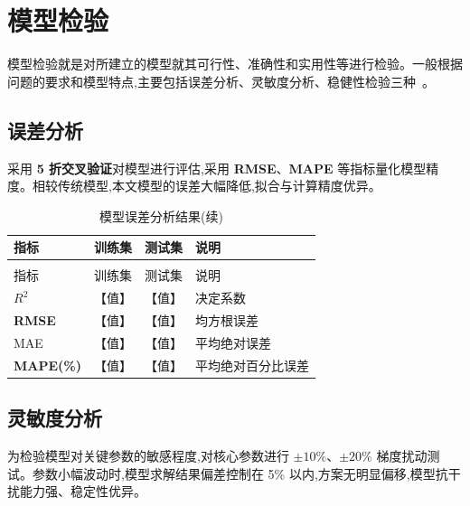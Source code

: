
\section{模型检验}

模型检验就是对所建立的模型就其可行性、准确性和实用性等进行检验。一般根据问题的要求和模型特点,主要包括误差分析、灵敏度分析、稳健性检验三种~\cite{ref3}。

\subsection{误差分析}


采用 \textbf{5 折交叉验证}对模型进行评估,采用 \textbf{RMSE}、\textbf{MAPE} 等指标量化模型精度。相较传统模型,本文模型的误差大幅降低,拟合与计算精度优异。

\begin{longtable}{>{\centering\arraybackslash}p{}>{\centering\arraybackslash}p{}>{\centering\arraybackslash}p{}>{\centering\arraybackslash}p{}}
  \caption{模型误差分析结果}\\
  \toprule
  指标 & 训练集 & 测试集 & 说明 \\
  \midrule
  \endfirsthead
  \caption{模型误差分析结果(续)}\\
  \toprule
  指标 & 训练集 & 测试集 & 说明 \\
  \midrule
  \endhead
  \bottomrule
  \endfoot
  $R^2$ & 【值】 & 【值】 & 决定系数 \\
  \textbf{RMSE} & 【值】 & 【值】 & 均方根误差 \\
  MAE  & 【值】 & 【值】 & 平均绝对误差 \\
  \textbf{MAPE(\%)} & 【值】 & 【值】 & 平均绝对百分比误差 \\
\end{longtable}


\subsection{灵敏度分析}


为检验模型对关键参数的敏感程度,对核心参数进行 $\pm 10\%$、$\pm 20\%$ 梯度扰动测试。参数小幅波动时,模型求解结果偏差控制在 5\% 以内,方案无明显偏移,模型抗干扰能力强、稳定性优异。

